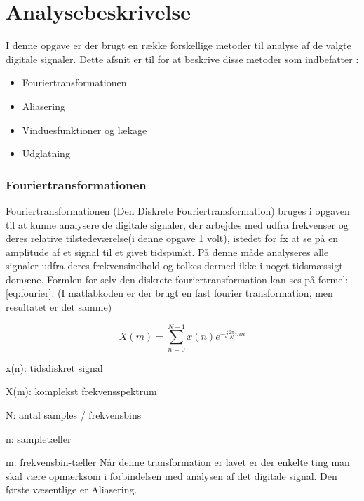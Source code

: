 \chapter{Analysebeskrivelse}\label{ch:analysebeskrivelse}

I denne opgave er der brugt en række forskellige metoder til analyse af de valgte digitale signaler. Dette afsnit er til for at beskrive disse metoder som indbefatter :
\begin{itemize}
\item Fouriertransformationen
\item Aliasering
\item Vinduesfunktioner og lækage
\item Udglatning
\end{itemize}
 
 
 
\subsection{Fouriertransformationen}

Fouriertransformationen (Den Diskrete Fouriertransformation) bruges i opgaven til at kunne analysere de digitale signaler, der arbejdes med udfra frekvenser og deres relative tilstedeværelse(i denne opgave 1 volt), istedet for fx at se på en amplitude af et signal til et givet tidspunkt. På denne måde analyseres alle signaler udfra deres frekvensindhold og tolkes dermed ikke i noget tidsmæssigt domæne. Formlen for selv den diskrete fouriertransformation kan ses på formel: \eqref{eq:fourier}. (I matlabkoden er der brugt en fast fourier transformation, men resultatet er det samme)

\begin{equation}\label{eq:fourier}
	{X(m)} = \displaystyle\sum_{n=0}^{N-1} {x(n)e^{-j\frac{2\pi}{N}mn}}
\end{equation}

x(n): tidsdiskret signal

X(m): komplekst frekvensspektrum

N: antal samples / frekvensbins

n: sampletæller

m: frekvensbin-tæller
\newline
\newline
 Når denne transformation er lavet er der enkelte ting man skal være opmærksom i forbindelsen med analysen af det  digitale signal. Den første væsentlige er Aliasering. 


